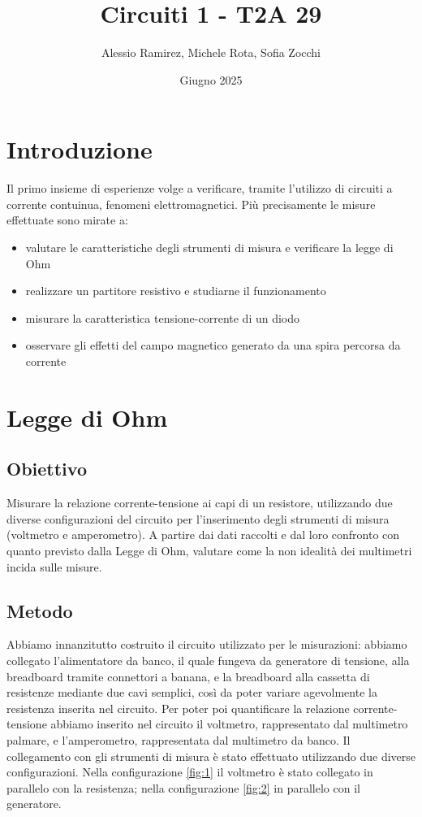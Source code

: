 \documentclass[a4paper]{article}
\title{Circuiti 1 - T2A 29}
\author{Alessio Ramirez, Michele Rota, Sofia Zocchi}
\date{Giugno 2025}
\begin{document}
\maketitle

\tableofcontents
\newpage

\section{Introduzione}
Il primo insieme di esperienze volge a verificare, tramite l'utilizzo di circuiti a
corrente contuinua, fenomeni elettromagnetici. Più precisamente le misure effettuate sono mirate a:
\begin{itemize}
	\item valutare le caratteristiche degli strumenti di misura e verificare la legge di Ohm
	\item realizzare un partitore resistivo e studiarne il funzionamento
	\item misurare la caratteristica tensione-corrente di un diodo
	\item osservare gli effetti del campo magnetico generato da una spira percorsa da corrente
\end{itemize}

\section{Legge di Ohm}
\subsection{Obiettivo}
Misurare la relazione corrente-tensione ai capi di un resistore, utilizzando due diverse configurazioni del circuito per l'inserimento degli strumenti di misura
(voltmetro e amperometro). A partire dai dati raccolti e dal loro confronto con quanto previsto dalla Legge di Ohm, valutare come la non idealità dei multimetri incida sulle misure.
\subsection{Metodo}
Abbiamo innanzitutto costruito il circuito utilizzato per le misurazioni: abbiamo collegato l'alimentatore da banco, il quale fungeva da generatore di tensione, alla breadboard tramite connettori a banana,
e la breadboard alla cassetta di resistenze mediante due cavi semplici, così da poter variare agevolmente la resistenza inserita nel circuito.
Per poter poi quantificare la relazione corrente-tensione abbiamo inserito nel circuito il voltmetro, rappresentato dal multimetro palmare, e l'amperometro, rappresentata dal multimetro da banco.
Il collegamento con gli strumenti di misura è stato effettuato utilizzando due diverse configurazioni. Nella configurazione \ref{fig:1} il voltmetro è stato collegato in parallelo con la resistenza;
nella configurazione \ref{fig:2} in parallelo con il generatore.
\end{document}
